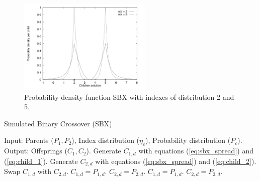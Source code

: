\begin{figure}[!t]
\centering
\includegraphics[width=2.5in]{img/DensitySBX_English.png}
\caption{Probability density function SBX with indexes of distribution 2 and 5.}
\label{fig_sim}
\end{figure}


\begin{algorithm}
\scriptsize
\caption{Simulated Binary Crossover (SBX)}
\label{alg:SBX_Operator}
\begin{algorithmic}[1]
    \STATE Input: Parents ($P_{1}, P_{2}$), Index distribution ($\eta_c$), Probability distribution ($P_c$).
    \STATE Output: Offsprings ($C_{1}, C_{2}$).
	 \label{alg:inherit_variable}
		\STATE Generate $C_{1,d}$ with equations (\ref{eq:sbx_spread}) and (\ref{eq:child_1}).
		\STATE Generate $C_{2,d}$ with equations (\ref{eq:sbx_spread}) and (\ref{eq:child_2}).
			\STATE Swap $C_{1,d}$ with $C_{2,d}$.
		 \ENDIF
        \ELSE
	   \STATE $C_{1,d} = P_{1, d}$.
	   \STATE $C_{2,d} = P_{2, d}$.
        \ENDIF
       \ENDFOR
    \ELSE
	\STATE $C_{1,d} = P_{1,d}$.
	\STATE $C_{2,d} = P_{2,d}$.
    \ENDIF
\end{algorithmic}
\end{algorithm}


